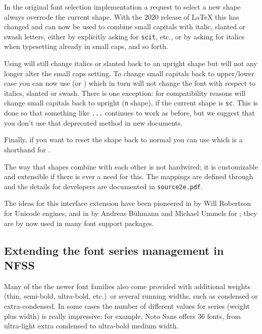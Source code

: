 \documentclass{ltnews}
\providecommand\pdfTeX{\hologo{pdfTeX}}
\begin{document}
In the original font selection implementation a request to select a new shape
always overrode the current shape. With the 2020 release of \LaTeX{}
this has changed and  can now be used to combine small
capitals with italic, slanted or swash letters, either by explicitly
asking for \texttt{scit}, etc., or by asking for italics when typesetting
already in small caps, and so forth.

Using  will still change italics or slanted back to an
upright shape but will not any longer alter the small caps setting. To
change small capitals back to upper/lower case you can now use
 (or ) which in turn will not change the font
with respect to italics, slanted or swash.
%
There is one exception: for compatibility reasons  will
change small capitals back to upright (\texttt{n} shape), if the
current shape is \texttt{sc}. This is done so that something like
\allowbreak\texttt{...}\allowbreak{} continues
to work as before, but we suggest that you don't use that deprecated method in
new documents.


Finally, if you want to
reset the shape back to normal you can use  which is a
shorthand for .

The way that shapes combine with each other is not hardwired; it is
customizable and extensible if there is ever a need for this. The
mappings
are defined through  and the
details for developers are documented in \texttt{source2e.pdf}.

The ideas for this interface extension have been pioneered in
 by Will Robertson for Unicode engines, and in
 by Andreas Bühmann and Michael Ummels for \pdfTeX{}; 
they are by now used in many font support packages.


\subsection{Extending the font series management in NFSS}

Many of the the newer font families also come provided with additional
weights (thin, semi-bold, ultra-bold, etc.)\ or several running widths,
such as condensed or extra-condensed.  In some cases the number of
different values for series (weight plus width) is really impressive: 
for example, Noto Sans
offers 36 fonts, from ultra-light extra condensed to ultra-bold medium width.
\end{document}
